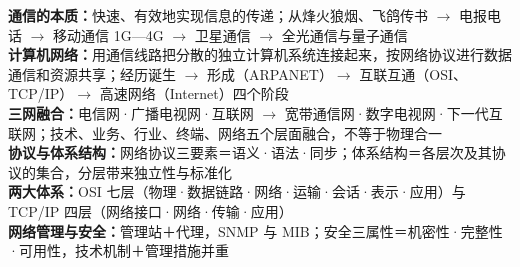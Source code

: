 \documentclass[a4paper,11pt]{article}
\begin{document}

\begin{knowmap}
\textbf{通信的本质：}快速、有效地实现信息的传递；从烽火狼烟、飞鸽传书 $\rightarrow$ 电报电话 $\rightarrow$ 移动通信 1G—4G $\rightarrow$ 卫星通信 $\rightarrow$ 全光通信与量子通信\\[2pt]
\textbf{计算机网络：}用通信线路把分散的独立计算机系统连接起来，按网络协议进行数据通信和资源共享；经历诞生 $\rightarrow$ 形成（ARPANET）$\rightarrow$ 互联互通（OSI、TCP/IP）$\rightarrow$ 高速网络（Internet）四个阶段\\[2pt]
\textbf{三网融合：}电信网·广播电视网·互联网 $\rightarrow$ 宽带通信网·数字电视网·下一代互联网；技术、业务、行业、终端、网络五个层面融合，不等于物理合一\\[2pt]
\textbf{协议与体系结构：}网络协议三要素＝语义·语法·同步；体系结构＝各层次及其协议的集合，分层带来独立性与标准化\\[2pt]
\textbf{两大体系：}OSI 七层（物理·数据链路·网络·运输·会话·表示·应用）与 TCP/IP 四层（网络接口·网络·传输·应用）\\[2pt]
\textbf{网络管理与安全：}管理站＋代理，SNMP 与 MIB；安全三属性＝机密性·完整性·可用性，技术机制＋管理措施并重
\end{knowmap}
\end{document}
